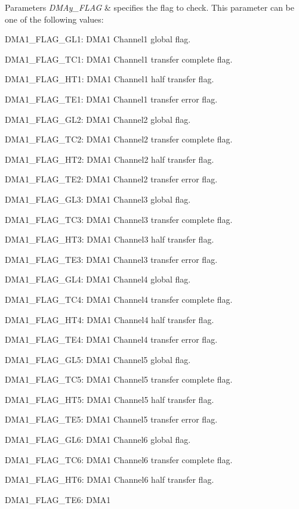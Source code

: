 \begin{DoxyParams}{Parameters}
{\em D\+M\+Ay\+\_\+\+F\+L\+AG} & specifies the flag to check. This parameter can be one of the following values\+: \begin{DoxyItemize}
\item D\+M\+A1\+\_\+\+F\+L\+A\+G\+\_\+\+G\+L1\+: D\+M\+A1 Channel1 global flag. \item D\+M\+A1\+\_\+\+F\+L\+A\+G\+\_\+\+T\+C1\+: D\+M\+A1 Channel1 transfer complete flag. \item D\+M\+A1\+\_\+\+F\+L\+A\+G\+\_\+\+H\+T1\+: D\+M\+A1 Channel1 half transfer flag. \item D\+M\+A1\+\_\+\+F\+L\+A\+G\+\_\+\+T\+E1\+: D\+M\+A1 Channel1 transfer error flag. \item D\+M\+A1\+\_\+\+F\+L\+A\+G\+\_\+\+G\+L2\+: D\+M\+A1 Channel2 global flag. \item D\+M\+A1\+\_\+\+F\+L\+A\+G\+\_\+\+T\+C2\+: D\+M\+A1 Channel2 transfer complete flag. \item D\+M\+A1\+\_\+\+F\+L\+A\+G\+\_\+\+H\+T2\+: D\+M\+A1 Channel2 half transfer flag. \item D\+M\+A1\+\_\+\+F\+L\+A\+G\+\_\+\+T\+E2\+: D\+M\+A1 Channel2 transfer error flag. \item D\+M\+A1\+\_\+\+F\+L\+A\+G\+\_\+\+G\+L3\+: D\+M\+A1 Channel3 global flag. \item D\+M\+A1\+\_\+\+F\+L\+A\+G\+\_\+\+T\+C3\+: D\+M\+A1 Channel3 transfer complete flag. \item D\+M\+A1\+\_\+\+F\+L\+A\+G\+\_\+\+H\+T3\+: D\+M\+A1 Channel3 half transfer flag. \item D\+M\+A1\+\_\+\+F\+L\+A\+G\+\_\+\+T\+E3\+: D\+M\+A1 Channel3 transfer error flag. \item D\+M\+A1\+\_\+\+F\+L\+A\+G\+\_\+\+G\+L4\+: D\+M\+A1 Channel4 global flag. \item D\+M\+A1\+\_\+\+F\+L\+A\+G\+\_\+\+T\+C4\+: D\+M\+A1 Channel4 transfer complete flag. \item D\+M\+A1\+\_\+\+F\+L\+A\+G\+\_\+\+H\+T4\+: D\+M\+A1 Channel4 half transfer flag. \item D\+M\+A1\+\_\+\+F\+L\+A\+G\+\_\+\+T\+E4\+: D\+M\+A1 Channel4 transfer error flag. \item D\+M\+A1\+\_\+\+F\+L\+A\+G\+\_\+\+G\+L5\+: D\+M\+A1 Channel5 global flag. \item D\+M\+A1\+\_\+\+F\+L\+A\+G\+\_\+\+T\+C5\+: D\+M\+A1 Channel5 transfer complete flag. \item D\+M\+A1\+\_\+\+F\+L\+A\+G\+\_\+\+H\+T5\+: D\+M\+A1 Channel5 half transfer flag. \item D\+M\+A1\+\_\+\+F\+L\+A\+G\+\_\+\+T\+E5\+: D\+M\+A1 Channel5 transfer error flag. \item D\+M\+A1\+\_\+\+F\+L\+A\+G\+\_\+\+G\+L6\+: D\+M\+A1 Channel6 global flag. \item D\+M\+A1\+\_\+\+F\+L\+A\+G\+\_\+\+T\+C6\+: D\+M\+A1 Channel6 transfer complete flag. \item D\+M\+A1\+\_\+\+F\+L\+A\+G\+\_\+\+H\+T6\+: D\+M\+A1 Channel6 half transfer flag. \item D\+M\+A1\+\_\+\+F\+L\+A\+G\+\_\+\+T\+E6\+: D\+M\+A1 
\end{DoxyItemize}
\end{DoxyParams}
